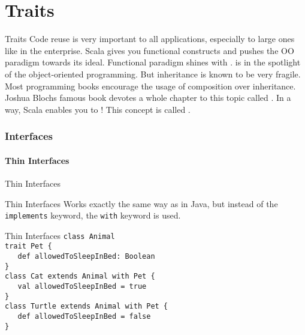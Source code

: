 \part[Traits]{Traits}
\begin{frame}{Traits}
Code reuse is very important to all applications, especially to large ones like
in the enterprise. Scala gives you functional constructs and pushes the OO
paradigm towards its ideal. Functional paradigm shines with
.  is in the spotlight
of the object-oriented programming. But inheritance is known to be very
\alert{fragile}. Most programming books encourage the usage of composition over inheritance.
Joshua Blochs famous book  devotes a whole chapter
to this topic called . In a
way, Scala enables you to !
This concept is called .
\end{frame}

\section{Interfaces}
\subsection{Thin Interfaces}
\begin{frame}[fragile]{Thin Interfaces}
\begin{block}{Thin Interfaces}
Works exactly the same way as in Java, but instead of the
\lstinline!implements! keyword, the \lstinline!with! keyword is
used.
\end{block}
\pause
\begin{exampleblock}{Thin Interfaces}
\lstinline!class Animal!\\
\lstinline!trait Pet {!\\
\lstinline!   def allowedToSleepInBed: Boolean!\\
\lstinline!}!\\
\lstinline!class Cat extends Animal with Pet {!\\
\lstinline!   val allowedToSleepInBed = true!\\
\lstinline!}!\\
\lstinline!class Turtle extends Animal with Pet {!\\
\lstinline!   def allowedToSleepInBed = false!\\
\lstinline!}!
\end{exampleblock}
\end{frame}
